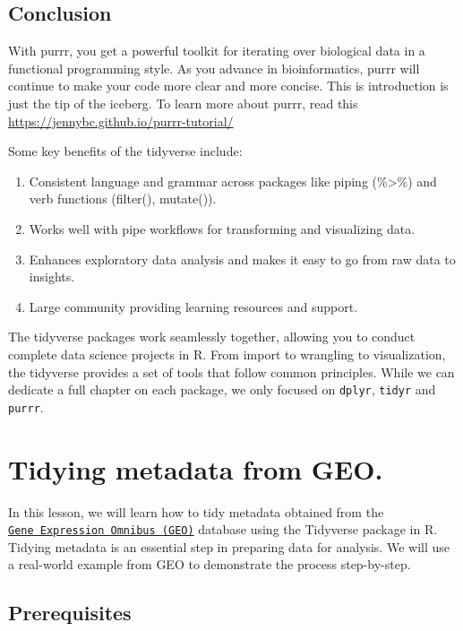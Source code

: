 \documentclass[
]{book}
\begin{document}
\hypertarget{conclusion-20}{%
\subsection{Conclusion}\label{conclusion-20}}

With purrr, you get a powerful toolkit for iterating over biological data in a functional programming style. As you advance in bioinformatics, purrr will continue to make your code more clear and more concise. This is introduction is just the tip of the iceberg. To learn more about purrr, read this \url{https://jennybc.github.io/purrr-tutorial/}

Some key benefits of the tidyverse include:

\begin{enumerate}
\def\labelenumi{\arabic{enumi}.}
\item
  Consistent language and grammar across packages like piping (\%\textgreater\%) and verb functions (filter(), mutate()).
\item
  Works well with pipe workflows for transforming and visualizing data.
\item
  Enhances exploratory data analysis and makes it easy to go from raw data to insights.
\item
  Large community providing learning resources and support.
\end{enumerate}

The tidyverse packages work seamlessly together, allowing you to conduct complete data science projects in R. From import to wrangling to visualization, the tidyverse provides a set of tools that follow common principles. While we can dedicate a full chapter on each package, we only focused on \texttt{dplyr}, \texttt{tidyr} and \texttt{purrr}.

\hypertarget{tidying-metadata-from-geo.}{%
\section{Tidying metadata from GEO.}\label{tidying-metadata-from-geo.}}

In this lesson, we will learn how to tidy metadata obtained from the \href{https://www.ncbi.nlm.nih.gov/geo/}{\texttt{Gene\ Expression\ Omnibus\ (GEO)}} database using the Tidyverse package in R. Tidying metadata is an essential step in preparing data for analysis. We will use a real-world example from GEO to demonstrate the process step-by-step.

\hypertarget{prerequisites}{%
\subsection{Prerequisites}\label{prerequisites}}
\end{document}
